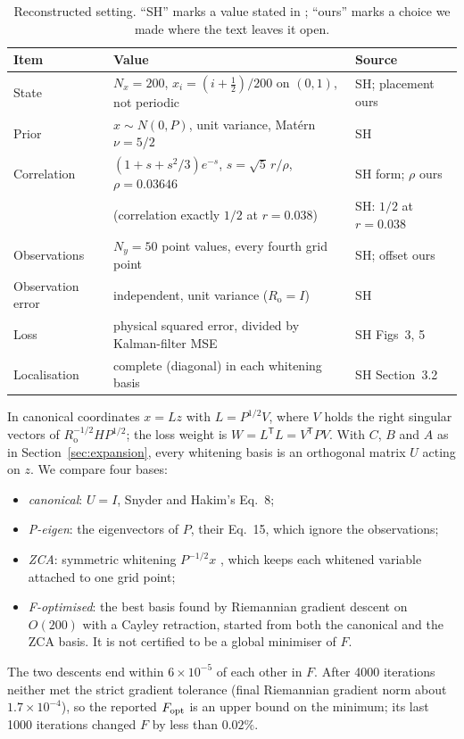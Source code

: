 \documentclass[11pt,a4paper]{article}
\numberwithin{equation}{section}
\theoremstyle{remark}\newtheorem{remark}[theorem]{Remark}
\newcommand{\T}{^{\mathsf T}}
\newcommand{\Rn}{R_{\mathrm o}}
\begin{document}
\begin{table}[ht]
\centering
\caption{Reconstructed setting. ``SH'' marks a value stated in
\cite[Section~4]{SnyderHakim2022}; ``ours'' marks a choice we made where the text leaves it
open.}
\label{tab:sh-setup}
\small
\begin{tabular}{lll}
\toprule
Item & Value & Source\\
\midrule
State & \(N_x=200\), \(x_i=(i+\tfrac12)/200\) on \((0,1)\), not periodic & SH; placement ours\\
Prior & \(x\sim N(0,P)\), unit variance, Mat\'ern \(\nu=5/2\) & SH\\
Correlation & \((1+s+s^2/3)e^{-s}\), \(s=\sqrt5\,r/\rho\), \(\rho=0.03646\) & SH form; \(\rho\) ours\\
& (correlation exactly \(1/2\) at \(r=0.038\)) & SH: \(1/2\) at \(r=0.038\)\\
Observations & \(N_y=50\) point values, every fourth grid point & SH; offset ours\\
Observation error & independent, unit variance (\(\Rn=I\)) & SH\\
Loss & physical squared error, divided by Kalman-filter MSE & SH Figs~3, 5\\
Localisation & complete (diagonal) in each whitening basis & SH Section~3.2\\
\bottomrule
\end{tabular}
\end{table}

In canonical coordinates \(x=Lz\) with \(L=P^{1/2}V\), where \(V\) holds the right singular vectors
of \(\Rn^{-1/2}HP^{1/2}\); the loss weight is \(W=L\T L=V\T PV\). With \(C\), \(B\) and \(A\) as in
Section~\ref{sec:expansion}, every whitening basis is an orthogonal matrix \(U\) acting on \(z\). We
compare four bases:
\begin{itemize}
\item \emph{canonical}: \(U=I\), Snyder and Hakim's Eq.~8;
\item \emph{P-eigen}: the eigenvectors of \(P\), their Eq.~15, which ignore the observations;
\item \emph{ZCA}: symmetric whitening \(P^{-1/2}x\) \cite{Kessy2018}, which keeps each whitened
 variable attached to one grid point;
\item \emph{F-optimised}: the best basis found by Riemannian gradient descent on \(O(200)\) with
 a Cayley retraction, started from both the canonical and the ZCA basis. It is not certified to
 be a global minimiser of \(F\).
\end{itemize}
The two descents end within \(6\times10^{-5}\) of each other in \(F\). After 4000 iterations
neither met the strict gradient tolerance (final Riemannian gradient norm about
\(1.7\times10^{-4}\)), so the reported \(F_{\rm opt}\) is an upper bound on the minimum; its last
1000 iterations changed \(F\) by less than \(0.02\%\).
\end{document}
